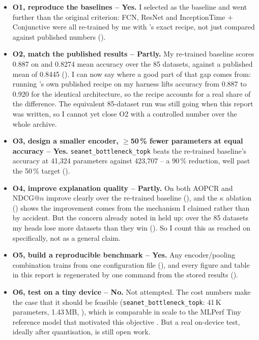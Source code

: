 \begin{itemize}\itemsep4pt
  \item \textbf{O1, reproduce the baselines -- Yes.} I selected \millet{} as the baseline and went
        further than the original criterion: FCN, ResNet and InceptionTime + Conjunctive were all
        re-trained by me with \seanet{}'s exact recipe, not just compared against published numbers
        ().

  \item \textbf{O2, match the published \millet{} results -- Partly.} My re-trained \millet{}
        baseline scores 0.887 on \webtraffic{} and 0.8274 mean accuracy over the 85 \ucr{} datasets,
        against a published \ucr{} mean of 0.8445 (). I can now say where a
        good part of that gap comes from: running \millet{}'s own published recipe on my harness
        lifts \webtraffic{} accuracy from 0.887 to 0.920 for the
        identical architecture, so the recipe accounts for a real share of the difference. The
        equivalent 85-dataset run was still going when this report was written, so I cannot yet
        close O2 with a controlled number over the whole archive.

  \item \textbf{O3, design a smaller encoder, $\geq$50\,\% fewer parameters at equal accuracy --
        Yes.} \texttt{seanet\_bottleneck\_topk} beats the re-trained \millet{} baseline's accuracy
        at 41{,}324 parameters against 423{,}707 -- a 90\,\% reduction, well past the 50\,\% target
        ().

  \item \textbf{O4, improve explanation quality -- Partly.} On \webtraffic{} both AOPCR and NDCG@$n$
        improve clearly over the re-trained baseline (), and the
        $\kappa$ ablation () shows the improvement comes from the mechanism
        I claimed rather than by accident. But the concern already noted in 
        held up: over the 85 \ucr{} datasets my heads lose more datasets than they win
        (). So I count this as reached on \webtraffic{} specifically, not as a
        general claim.

  \item \textbf{O5, build a reproducible benchmark -- Yes.} Any encoder/pooling combination trains
        from one configuration file (), and every figure and table in this
        report is regenerated by one command from the stored results ().

  \item \textbf{O6, test on a tiny device -- No.} Not attempted. The cost numbers make the case that
        it should be feasible (\texttt{seanet\_bottleneck\_topk}: 41\,K parameters, 1.43\,MB,
        ), which is comparable in scale to the MLPerf Tiny reference model that
        motivated this objective \citep{banbury2021mlperftiny}. But a real on-device test, ideally
        after quantisation, is still open work.
\end{itemize}

